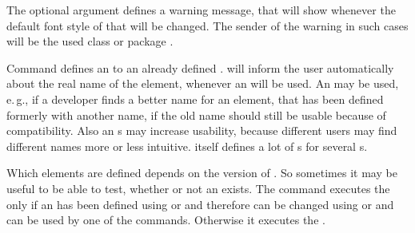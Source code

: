 The optional argument  defines a warning message,
that \KOMAScript{} will show whenever the default font style of that
 will be changed. The sender of the warning in such cases will
be the used \KOMAScript{} class or package .

Command  defines an  to an already
defined . \KOMAScript{} will inform the user automatically
about the real name of the element, whenever an  will be
used. An  may be used, e.\,g., if a
developer finds a better name for an element, that has been defined formerly
with another name, if the old name should still be usable because of
compatibility. Also an s may increase usability, because
different users may find different names more or less intuitive. \KOMAScript{}
itself defines a lot of s for several s.
%
%
%

\begin{Declaration}
\end{Declaration}
%
Which elements are defined depends on the
version of \KOMAScript. So sometimes it may be useful to be able to test,
whether or not an  exists. The command executes the  only if an  has been defined using 
or  and therefore can be changed using
 or  and can be used by one of the
 commands. Otherwise it executes the .%
%


